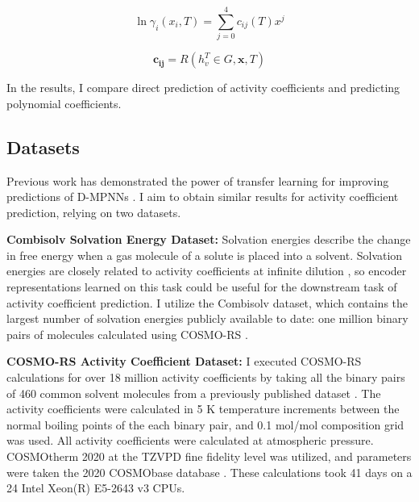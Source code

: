 \begin{equation}
    \ln \gamma_i(x_i,T) = \sum_{j=0}^4 c_{ij}(T)x^j
\end{equation}

\begin{equation}
     \mathbf{c_{ij}} = R(h_v^T \in G, \mathbf{x}, T)
\end{equation}

In the results, I compare direct prediction of activity coefficients and predicting polynomial coefficients.

\subsection{Datasets}

Previous work has demonstrated the power of transfer learning for improving predictions of D-MPNNs \cite{Vermeire2021}. I aim to obtain similar results for activity coefficient prediction, relying on two datasets.

\noindent
\textbf{Combisolv Solvation Energy Dataset:} Solvation energies describe the change in free energy when a gas molecule of a solute is placed into a solvent. Solvation energies are closely related to activity coefficients at infinite dilution \cite{Moine2017}, so encoder representations learned on this task could be useful for the downstream task of activity coefficient prediction. I utilize the Combisolv dataset, which contains the largest number of solvation energies publicly available to date: one million binary pairs of molecules calculated using COSMO-RS \cite{Vermeire2021}.

\noindent
\textbf{COSMO-RS Activity Coefficient Dataset:} I executed COSMO-RS calculations for over 18 million activity coefficients by taking all the binary pairs of 460 common solvent molecules from a previously published dataset \cite{Amar2019}. The activity coefficients were calculated in 5 K temperature increments between the normal boiling points of the each binary pair, and 0.1 mol/mol composition grid was used. All activity coefficients were calculated at atmospheric pressure. COSMOtherm 2020 at the TZVPD fine fidelity level was utilized, and parameters were taken the 2020 COSMObase database \cite{Klamt2010}. These calculations took 41 days on a 24 Intel Xeon(R) E5-2643 v3 CPUs. 



